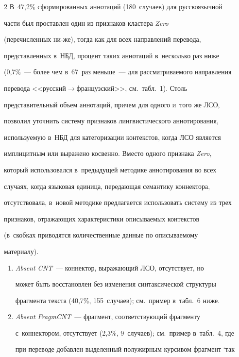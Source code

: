 \begin{multicols}{2}
   В~47,2\% сформированных аннотаций (180~случаев) для русскоязычной 


части был проставлен один из признаков кластера \textit{Zero} 


(перечисленных ни-\linebreak же), тогда как для всех направлений перевода, 


представ\-лен\-ных в~НБД, процент таких аннотаций в~несколько раз ниже 


(0,7\%~--- более чем в~67~раз меньше~--- для рассматриваемого на\-прав\-ле\-ния 


перевода <<рус\-ский\;$\to$\;фран\-цуз\-ский>>, см.\ табл.~1). Столь 


представительный объем аннотаций, причем для одного и~того же ЛСО, 


позволил уточнить систему признаков лингвистического аннотирования, 


используемую в~НБД для категоризации контекстов, когда ЛСО является 


имплицитным или выражено косвенно. Вместо одного признака \textit{Zero}, 


который использовался в~предыдущей методике аннотирования во всех 


случаях, когда языковая единица, передающая семантику коннектора, 


отсутствовала, в~новой методике предлагается использовать систему из трех 


признаков, отражающих характеристики описываемых контекстов 


(в~скобках приводятся количественные данные по описываемому 


материалу).


   \begin{enumerate}[1.]


\item \textit{Absent CNT}~--- коннектор, выражающий ЛСО, отсутствует, но 


может быть восстановлен без изменения синтаксической структуры 


фрагмента текста (40,7\%, 155~случаев); см.\ пример в~табл.~6 ниже.


\item \textit{Absent FragmCNT}~--- фрагмент, со\-от\-вет\-ст\-ву\-ющий фрагменту 


с~коннектором, отсутствует (2,3\%, 9~случаев); см.\ пример в~табл.~4, где 


при переводе добавлен выделенный полужирным курсивом фрагмент `так 



\end{enumerate}
\end{multicols}
